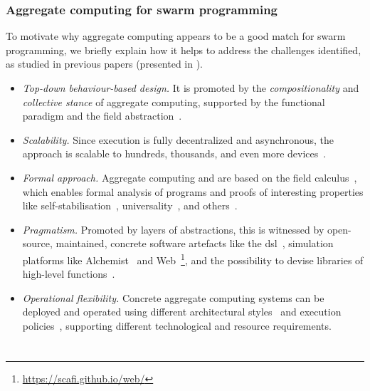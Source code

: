 \subsubsection{Aggregate computing for swarm programming}
%
To motivate why aggregate computing appears to be a good match for swarm programming, we briefly explain how it helps to address the challenges identified, as studied in previous papers (presented in ).
%
\begin{itemize}
\item \emph{Top-down behaviour-based design.} It is promoted by the \emph{compositionality} and \emph{collective stance} of aggregate computing, supported by the functional paradigm and the field abstraction~\cite{AVDPB-TOCL2019,DBLP:conf/ecoop/AudritoCDSV22}.
\item \emph{Scalability.} Since execution is fully decentralized and asynchronous, the approach is scalable to hundreds, thousands, and even more devices~\cite{DBLP:journals/eaai/CasadeiVAPD21}.
\item \emph{Formal approach.} Aggregate computing and \scafi{} are based on the field calculus~\cite{ACDV-LMCS2023,AVDPB-TOCL2019}, which enables formal analysis of programs and proofs of interesting properties like self-stabilisation~\cite{DBLP:journals/tomacs/ViroliABDP18}, universality~\cite{DBLP:conf/coordination/AudritoBDV18}, and others~\cite{DBLP:journals/jlap/ViroliBDACP19}.
\item \emph{Pragmatism.} Promoted by layers of abstractions, this is witnessed by open-source, maintained, concrete software artefacts like the \scafi{} \ac{dsl}~\cite{DBLP:journals/softx/CasadeiVAP22},  simulation platforms like Alchemist~\cite{DBLP:journals/jos/PianiniMV13} and {\sc{}\scafi{} Web}~\cite{DBLP:conf/coordination/AguzziCMPV21}\footnote{\url{https://scafi.github.io/web/}}, and the possibility to devise libraries of high-level functions~\cite{DBLP:journals/eaai/CasadeiVAPD21}.
\item \emph{Operational flexibility.} Concrete aggregate computing systems can be deployed and operated using different architectural styles~\cite{DBLP:journals/fi/CasadeiPPVW20} and execution policies~\cite{DBLP:journals/lmcs/PianiniCVMZ21}, supporting different technological and resource requirements.
\end{itemize}
%

\section{\MacroSwarm{}}
\label{sec:contrib}

